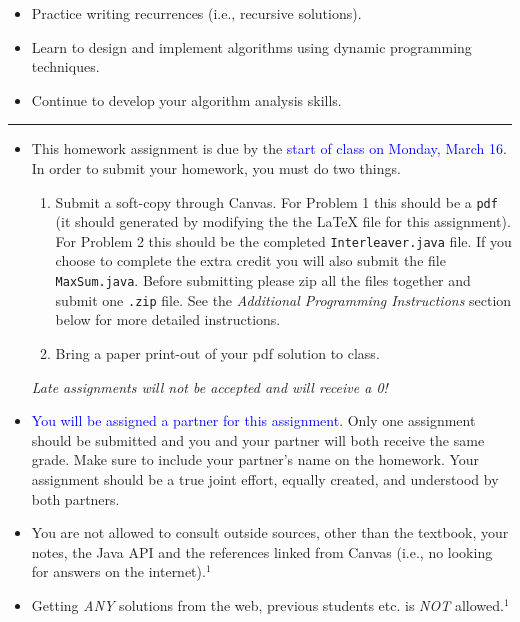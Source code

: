 \documentclass[11pt]{exam}
\begin{document}

 \begin{itemize}
\item Practice writing recurrences (i.e., recursive solutions).
 \item Learn to design and implement algorithms using dynamic programming techniques.
\item Continue to develop your algorithm analysis skills.
 \end{itemize}

\hrule
\vspace{2em}

\begin{itemize}
\item This homework assignment is due by the \textcolor{blue}{start of class on Monday, March 16}. In order to submit your homework, you must do two things.
\begin{enumerate}
\item Submit a soft-copy through Canvas.  For Problem 1 this should be a  \texttt{pdf}  (it should generated by modifying the the LaTeX file for this assignment).  For Problem 2 this should be the completed \texttt{Interleaver.java} file.  If you choose to complete the extra credit you will also submit the file \texttt{MaxSum.java}. Before submitting please zip all the files together and submit one \texttt{.zip} file.  See the \emph{Additional Programming Instructions} section below for more detailed instructions.
\item Bring a paper print-out of your pdf solution to class.
\end{enumerate}
\emph{Late assignments will not be accepted and will receive a 0!}
\item \textcolor{blue}{You will be assigned a partner for this assignment.}  Only one assignment should be submitted and you and your partner will both receive the same grade.   Make sure to include your partner's name on the homework.  Your assignment should be a true joint effort, equally created, and understood by both partners. 
\item You are not allowed to consult outside sources, other than the textbook, your notes, the Java API and the references linked from Canvas (i.e., no looking for answers on the internet).$^1$
\item Getting \emph{ANY} solutions from the web, previous students etc. is \emph{NOT} allowed.$^1$ 

\end{itemize}
\end{document}
